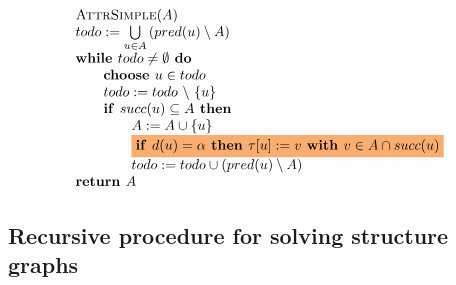 \documentclass{article}
\newcommand{\If}{\text{\textbf{if }}}
\newcommand{\Do}{\text{\textbf{ do }}}
\newcommand{\Then}{\text{\textbf{ then }}}
\newcommand{\While}{\text{\textbf{while }}}
\newcommand{\Choose}{\text{\textbf{choose }}}
\newcommand{\Return}{\text{\textbf{return }}}
\newcommand{\With}{\text{\textbf{ with }}}
\begin{document}
\begin{equation*}
\begin{array}{l}
\textsc{AttrSimple}(A) \\ 
todo:=\bigcup\limits_{u\in A}\left( pred(u)\setminus A\right)  \\ 
\While todo \neq \emptyset \Do \\ 
\qquad \Choose u \in todo \\ 
\qquad todo:=todo\ \backslash \ \{u\} \\ 
\qquad \If succ(u)\subseteq A \Then \\ 
\qquad \qquad A:=A\cup \{u\} \\ 
\qquad \qquad \colorbox{Apricot}{$ \If d(u) = \alpha \Then \tau
\lbrack u]:=v\With v\in A\cap succ(u) $}\\ 
\qquad \qquad todo:=todo\cup \left( pred(u)\setminus A\right)  \\ 
\Return A
\end{array}
\end{equation*}

\subsection{Recursive procedure for solving structure graphs}
\end{document}
